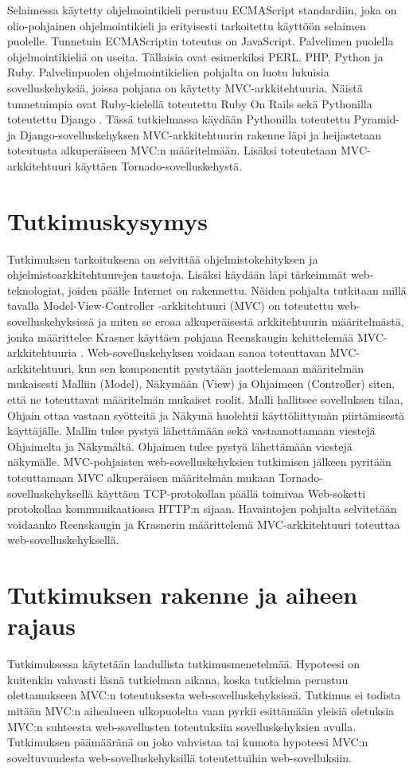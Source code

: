 \documentclass[utf8]{gradu3}
\begin{document}
Selaimessa käytetty ohjelmointikieli perustuu ECMAScript standardiin, joka on olio-pohjainen ohjelmointikieli ja erityisesti tarkoitettu käyttöön selaimen puolelle. Tunnetuin ECMAScriptin toteutus on JavaScript. Palvelimen puolella ohjelmointikieliä on useita. Tällaisia ovat esimerkiksi PERL, PHP, Python ja Ruby. Palvelinpuolen ohjelmointikielien pohjalta on luotu lukuisia sovelluskehyksiä, joissa pohjana on käytetty MVC-arkkitehtuuria. Näistä tunnetuimpia ovat Ruby-kielellä toteutettu Ruby On Rails sekä Pythonilla toteutettu Django \parencite{trends}. Tässä tutkielmassa käydään Pythonilla toteutettu Pyramid- ja Django-sovelluskehyksen MVC-arkkitehtuurin rakenne läpi ja heijastetaan toteutusta alkuperäiseen MVC:n määritelmään. Lisäksi toteutetaan MVC-arkkitehtuuri käyttäen Tornado-sovelluskehystä.

\section{Tutkimuskysymys}
Tutkimuksen tarkoituksena on selvittää ohjelmistokehityksen ja ohjelmistoarkkitehtuurejen taustoja. Lisäksi käydään läpi tärkeimmät web-teknologiat, joiden päälle Internet on rakennettu. Näiden pohjalta tutkitaan millä tavalla 
Model-View-Controller -arkkitehtuuri (MVC) on toteutettu web-sovelluskehyksissä ja miten se
eroaa alkuperäisestä arkkitehtuurin määritelmästä, jonka määrittelee Krasner \parencite{krasner} käyttäen pohjana Reenskaugin kehittelemää MVC-arkkitehtuuria \parencite{reenskaug_tools}. Web-sovelluskehyksen voidaan sanoa toteuttavan MVC-arkkitehtuuri, kun sen komponentit pystytään jaottelemaan määritelmän mukaisesti Malliin (Model), Näkymään (View) ja Ohjaimeen (Controller) siten, että ne toteuttavat määritelmän mukaiset roolit. Malli hallitsee sovelluksen tilaa, Ohjain ottaa vastaan syötteitä ja Näkymä huolehtii käyttöliittymän piirtämisestä käyttäjälle. Mallin tulee pystyä lähettämään sekä vastaanottamaan viestejä Ohjaimelta ja Näkymältä. Ohjaimen tulee pystyä lähettämään viestejä näkymälle. MVC-pohjaisten web-sovelluskehyksien tutkimisen jälkeen pyritään toteuttamaan MVC alkuperäisen määritelmän mukaan Tornado-sovelluskehyksellä käyttäen TCP-protokollan päällä toimivaa Web-soketti protokollaa kommunikaatiossa HTTP:n sijaan. Havaintojen pohjalta selvitetään voidaanko Reenskaugin ja Krasnerin määrittelemä MVC-arkkitehtuuri toteuttaa web-sovelluskehyksellä. 

\section{Tutkimuksen rakenne ja aiheen rajaus}
Tutkimuksessa käytetään laadullista tutkimusmenetelmää. Hypoteesi on kuitenkin vahvasti läsnä tutkielman aikana, koska tutkielma perustuu olettamukseen MVC:n toteutuksesta web-sovelluskehyksissä. Tutkimus ei todista mitään MVC:n aihealueen ulkopuolelta vaan pyrkii esittämään yleisiä oletuksia 
MVC:n suhteesta web-sovellusten toteutuksiin sovelluskehyksien avulla. Tutkimuksen päämääränä on joko vahvistaa tai kumota hypoteesi MVC:n soveltuvuudesta web-sovelluskehyksillä toteutettuihin web-sovelluksiin. 
\end{document}
